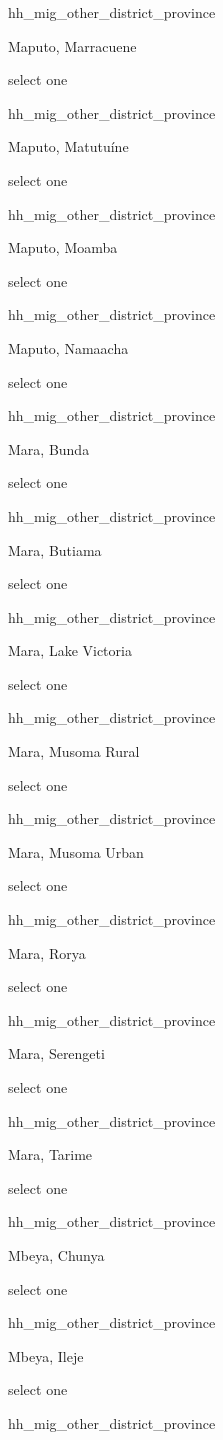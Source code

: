 \documentclass[]{article}
\begin{document}
hh\_mig\_other\_district\_province

Maputo, Marracuene

select one

hh\_mig\_other\_district\_province

Maputo, Matutuíne

select one

hh\_mig\_other\_district\_province

Maputo, Moamba

select one

hh\_mig\_other\_district\_province

Maputo, Namaacha

select one

hh\_mig\_other\_district\_province

Mara, Bunda

select one

hh\_mig\_other\_district\_province

Mara, Butiama

select one

hh\_mig\_other\_district\_province

Mara, Lake Victoria

select one

hh\_mig\_other\_district\_province

Mara, Musoma Rural

select one

hh\_mig\_other\_district\_province

Mara, Musoma Urban

select one

hh\_mig\_other\_district\_province

Mara, Rorya

select one

hh\_mig\_other\_district\_province

Mara, Serengeti

select one

hh\_mig\_other\_district\_province

Mara, Tarime

select one

hh\_mig\_other\_district\_province

Mbeya, Chunya

select one

hh\_mig\_other\_district\_province

Mbeya, Ileje

select one

hh\_mig\_other\_district\_province
\end{document}
